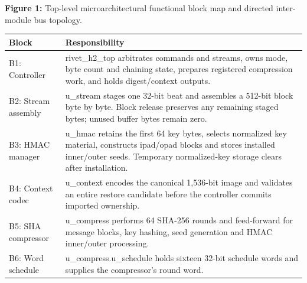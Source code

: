 \documentclass[11pt,a4paper]{article}
\begin{document}
\begin{center}
\begin{minipage}{\textwidth}
\par\vspace{3pt}

{\small\textbf{Figure 1:} Top-level microarchitectural functional block map and directed inter-module bus topology.}\end{minipage}\end{center}

{\small\renewcommand{\arraystretch}{1.18}\begin{longtable}{@{}L{0.24\textwidth}|L{0.7\textwidth}@{}}\toprule

\textbf{Block} & \textbf{Responsibility}\\\midrule\endhead

B1: Controller & rivet\_\allowbreak{}h2\_\allowbreak{}top arbitrates commands and streams,\allowbreak{} owns mode,\allowbreak{} byte count and chaining state,\allowbreak{} prepares registered compression work,\allowbreak{} and holds digest/\allowbreak{}context outputs.\\[2pt]\hline

B2: Stream assembly & u\_\allowbreak{}stream stages one 32-bit beat and assembles a 512-bit block byte by byte. Block release preserves any remaining staged bytes; unused buffer bytes remain zero.\\[2pt]\hline

B3: HMAC manager & u\_\allowbreak{}hmac retains the first 64 key bytes,\allowbreak{} selects normalized key material,\allowbreak{} constructs ipad/\allowbreak{}opad blocks and stores installed inner/\allowbreak{}outer seeds. Temporary normalized-key storage clears after installation.\\[2pt]\hline

B4: Context codec & u\_\allowbreak{}context encodes the canonical 1,\allowbreak{}536-bit image and validates an entire restore candidate before the controller commits imported ownership.\\[2pt]\hline

B5: SHA compressor & u\_\allowbreak{}compress performs 64 SHA-256 rounds and feed-forward for message blocks,\allowbreak{} key hashing,\allowbreak{} seed generation and HMAC inner/\allowbreak{}outer processing.\\[2pt]\hline

B6: Word schedule & u\_\allowbreak{}compress.u\_\allowbreak{}schedule holds sixteen 32-bit schedule words and supplies the compressor's round word.\\[2pt]\hline

\bottomrule\end{longtable}}
\end{document}
